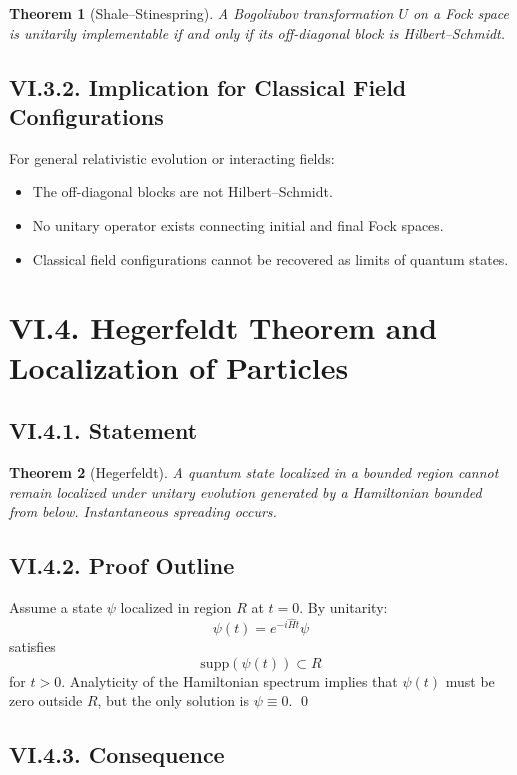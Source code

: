 \documentclass[12pt,oneside]{book}
\theoremstyle{plain}
\newtheorem{theorem}{Theorem}[chapter]
\theoremstyle{definition}
\begin{document}
\begin{theorem}[Shale–Stinespring]
A Bogoliubov transformation $U$ on a Fock space is unitarily implementable if and only if its off-diagonal block is Hilbert–Schmidt.
\end{theorem}

\subsection*{VI.3.2. Implication for Classical Field Configurations}

For general relativistic evolution or interacting fields:

\begin{itemize}
    \item The off-diagonal blocks are not Hilbert–Schmidt.
    \item No unitary operator exists connecting initial and final Fock spaces.
    \item Classical field configurations cannot be recovered as limits of quantum states.
\end{itemize}

\section{VI.4. Hegerfeldt Theorem and Localization of Particles}

\subsection*{VI.4.1. Statement}

\begin{theorem}[Hegerfeldt]
A quantum state localized in a bounded region cannot remain localized under unitary evolution generated by a Hamiltonian bounded from below. Instantaneous spreading occurs.
\end{theorem}

\subsection*{VI.4.2. Proof Outline}

Assume a state $\psi$ localized in region $R$ at $t=0$. By unitarity:
\[
\psi(t) = e^{-i\widehat{H}t} \psi
\]
satisfies
\[
\text{supp}(\psi(t)) \subset R
\]
for $t>0$. Analyticity of the Hamiltonian spectrum implies that $\psi(t)$ must be zero outside $R$, but the only solution is $\psi \equiv 0$. \qed

\subsection*{VI.4.3. Consequence}
\end{document}
